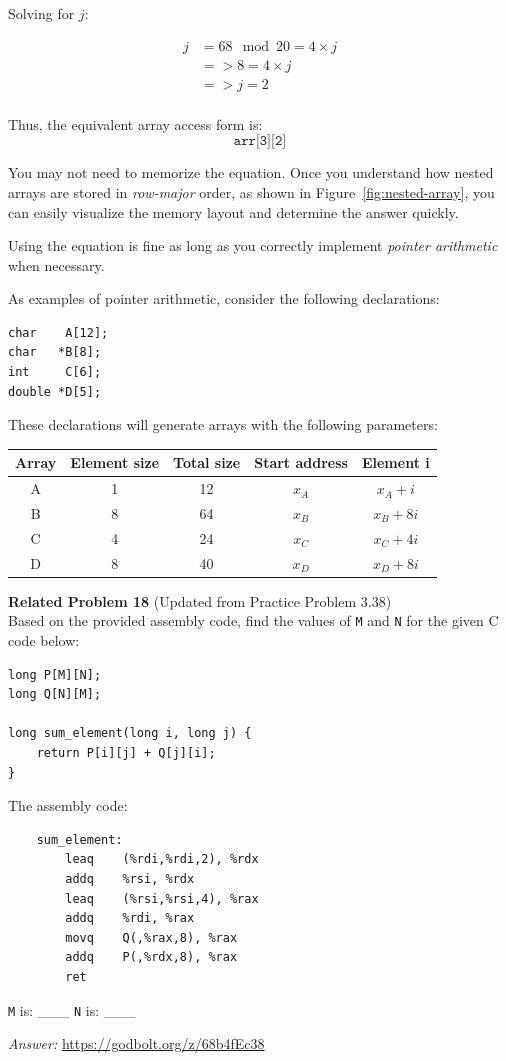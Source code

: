 Solving for \( j \):

\begin{align*}
j &= 68 \mod 20 = 4 \times j \\
  &=> 8 = 4 \times j \\
  &=> j = 2 \\
\end{align*}

Thus, the equivalent array access form is:
\[
\texttt{arr[3][2]}
\]

You may not need to memorize the equation. Once you understand how nested arrays are stored in \textit{row-major} order, as shown in Figure~\ref{fig:nested-array}, you can easily visualize the memory layout and determine the answer quickly. 

Using the equation is fine as long as you correctly implement \textit{pointer arithmetic} when necessary.

As examples of pointer arithmetic, consider the following declarations:

\begin{verbatim}
char    A[12];
char   *B[8];
int     C[6];
double *D[5];
\end{verbatim}

These declarations will generate arrays with the following parameters:
\begin{table}[h]
    \centering
    \begin{tabular}{c c c c c}
        \toprule
        \textbf{Array} & \textbf{Element size} & \textbf{Total size} & \textbf{Start address} & \textbf{Element i} \\ %
        \midrule
        A & 1  & 12  & \( x_A \)  & \( x_A + i \) \\ %
        B & 8  & 64  & \( x_B \)  & \( x_B + 8i \) \\ 
        C & 4  & 24  & \( x_C \)  & \( x_C + 4i \) \\ 
        D & 8  & 40  & \( x_D \)  & \( x_D + 8i \) \\ 
        \bottomrule
    \end{tabular}
\end{table}

\noindent\textbf{Related Problem 18} (Updated from Practice Problem 3.38) \\
Based on the provided assembly code, find the values of \texttt{M} and \texttt{N} for the given C code below:
\begin{verbatim}
long P[M][N];
long Q[N][M];

long sum_element(long i, long j) {
    return P[i][j] + Q[j][i];
}
\end{verbatim}
The assembly code:
\begin{verbatim}
    sum_element:
        leaq    (%rdi,%rdi,2), %rdx
        addq    %rsi, %rdx
        leaq    (%rsi,%rsi,4), %rax
        addq    %rdi, %rax
        movq    Q(,%rax,8), %rax
        addq    P(,%rdx,8), %rax
        ret
\end{verbatim}

\noindent\texttt{M} is: \_\_\_ \newline
\texttt{N} is: \_\_\_ 

\textit{Answer: }\url{https://godbolt.org/z/68b4fEc38} 
\clearpage